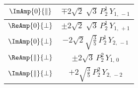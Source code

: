 \begin{table}[p]
\begin{tabular}{cc}
    $\ImAmp{0}{\parallel}$  &
      $\mp 2\sqrt{2}\;\sqrt{3}\, P_2^1\, Y_{1,\,-1}$  \\
    \hline

    $\ReAmp{0}{\perp}$  &
      $\pm 2\sqrt{2}\;\sqrt{3}\, P_2^1\, Y_{1,\,+1}$  \\
    \hline

    $\ImAmp{0}{\perp}$  &
      $-2\sqrt{2}\sqrt{\tfrac{3}{5}}\, P_2^1\, Y_{2,\,-1}$  \\
    \hline

    $\ReAmp{\parallel}{\perp}$  &
      $\pm 2\sqrt{3}\, P_2^2\, Y_{1,\,0}$  \\
    \hline

    $\ImAmp{\parallel}{\perp}$  &
      $+2\sqrt{\tfrac{3}{5}}\, P_2^2\, Y_{2,\,-2}$  \\
    \hline
  \end{tabular}
\end{table}


